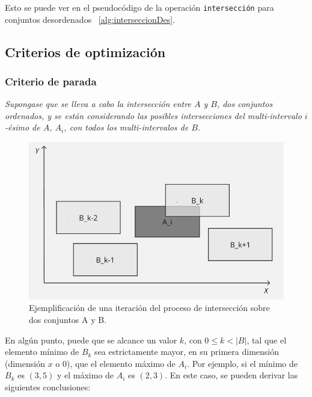Esto se puede ver en el pseudocódigo de la operación \texttt{intersección} para conjuntos desordenados ~\ref{alg:interseccionDes}.
\subsection{Criterios de optimización}

\subsubsection{Criterio de parada}

\begin{center}
    \textit{Supongase que se lleva a cabo la intersección entre $A$ y $B$, dos conjuntos ordenados, y se están considerando las posibles intersecciones del multi-intervalo \( i \)-ésimo de $A$, \( A_i \), con todos los multi-intervalos de $B$.}
\end{center}

\begin{figure}[h]
     \centering
    \includegraphics[width=0.75\linewidth]{figures/Optimazaciones/Interseccion/interseccion1a1.png}\par
    \caption{Ejemplificación de una iteración del proceso de intersección sobre dos conjuntos A y B.}
    \label{fig:enter-label}
\end{figure}

En algún punto, puede que se alcance un valor $k$, con $0 \leq k < |B|$, tal que el elemento mínimo de $B_k$ sea estrictamente mayor, en su primera dimensión (dimensión $x$ o $0$), que el elemento máximo de $A_i$. Por ejemplo, si el mínimo de $B_k$ es $(3,5)$ y el máximo de $A_i$ es  $(2,3)$. En este caso, se pueden derivar las siguientes conclusiones:

